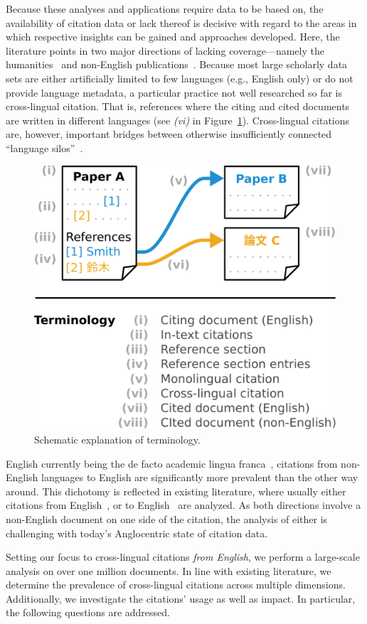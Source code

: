 Because these analyses and applications require data to be based on, the availability of citation data or lack thereof is decisive with regard to the areas in which respective insights can be gained and approaches developed. Here, the literature points 
in two major directions of lacking coverage---namely the humanities~\cite{Colavizza2019,Kellsey2004} and non-English publications~\cite{Vera-Baceta2019,Liu2019,Moed2018,Moskaleva2019,MartinMartin2021}.
Because most large scholarly data sets are either artificially limited to few languages (e.g., English only) or do not provide language metadata,
a particular practice not well researched so far is cross-lingual citation. That is, references where the citing and cited documents are written in different languages (see \textit{(vi)} in Figure~\ref{fig:terminology}).
Cross-lingual citations are, however, important bridges between otherwise insufficiently connected ``language silos''~\cite{Shu2019,Moskaleva2019}.

\begin{figure}[b] %
\centering
\includegraphics[width=0.5\linewidth]{figures/ref_xling/terminology_with_text_twocolumn.pdf}
\caption{Schematic explanation of terminology.} \label{fig:terminology}
\end{figure}

English currently being the de facto academic lingua franca~\cite{Montgomery2013}, citations from non-English languages to English are significantly more prevalent than the other way around. This dichotomy is reflected in existing literature, where usually either citations from English~\cite{Kellsey2004,Lillis2010}, or to English~\cite{Tang2014,Jiang2018,Jiang2018b,Schrader2019} are analyzed. As both directions involve a non-English document on one side of the citation, the analysis of either is challenging with today's Anglocentric state of citation data.

Setting our focus to cross-lingual citations \emph{from English}, we perform a large-scale analysis on over one million documents.
In line with existing literature, we determine the prevalence of cross-lingual citations across multiple dimensions. Additionally, we investigate the citations' usage as well as impact. In particular, the following questions are addressed.


